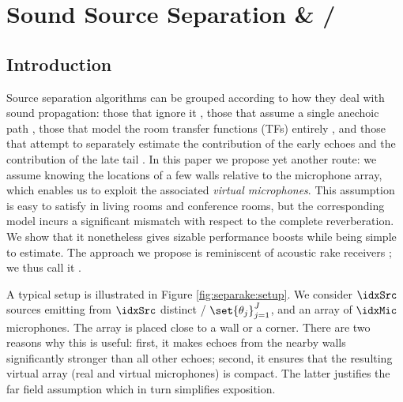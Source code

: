 \chapter{Sound Source Separation \& \SEPARAKEdef/}\label{chap:separake}

 \synopsisChSeparake

\section{Introduction}
Source separation algorithms can be grouped according to how they deal with sound propagation:
those that ignore it , those that assume a single anechoic path ,
those that model the room transfer functions (TFs) entirely ,
and those that attempt to separately estimate the contribution of the early echoes and the contribution of the late tail .
In this paper we propose yet another route: we assume knowing the locations of a few walls relative to the microphone array,
which enables us to exploit the associated \textit{virtual microphones}.
This assumption is easy to satisfy in living rooms and conference rooms, but the corresponding model incurs a significant mismatch with respect to the complete reverberation.
We show that it nonetheless gives sizable performance boosts while being simple to estimate.
The approach we propose is reminiscent of acoustic rake receivers ;
we thus call it \separake.

A typical setup is illustrated in Figure \ref{fig:separake:setup}.
We consider $\idxSrc$ sources emitting from $\idxSrc$ distinct \DOAsdef/ $\set{\theta_j}_{j=1}^J$, and an array of $\idxMic$ microphones.
The array is placed close to a wall or a corner.
There are two reasons why this is useful:
first, it makes echoes from the nearby walls significantly stronger than all other echoes;
second, it ensures that the resulting virtual array (real and virtual microphones) is compact.
The latter justifies the far field assumption which in turn simplifies exposition.

